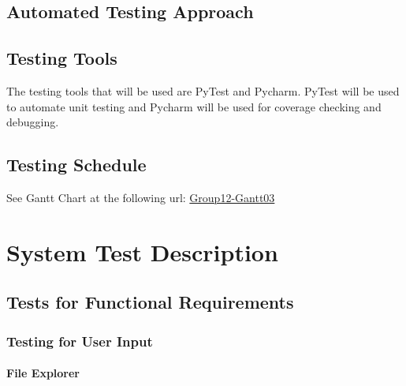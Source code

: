 \documentclass[12pt, titlepage]{article}
\begin{document}
\subsection{Automated Testing Approach}

\subsection{Testing Tools}
The testing tools that will be used are PyTest and Pycharm. PyTest will be used to automate unit testing and Pycharm will be used for coverage checking and debugging.

\subsection{Testing Schedule}
See Gantt Chart at the following url: \color{blue}
\href{https://gitlab.cas.mcmaster.ca/liangw15/3XA3Project/blob/master/ProjectSchedule/Group12_Gantt03.pdf}{ Group12-Gantt03}

\color{black}

\section{System Test Description}
	
\subsection{Tests for Functional Requirements}

\subsubsection{Testing for User Input}
		
\paragraph{File Explorer}
\end{document}
